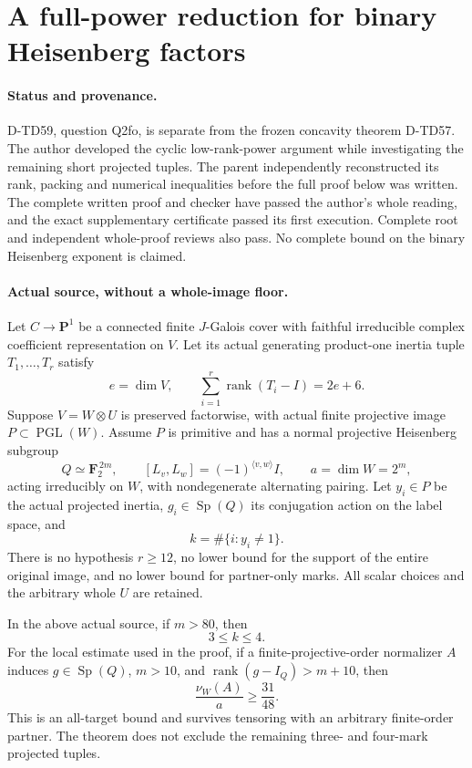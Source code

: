 \section{A full-power reduction for binary Heisenberg factors}
\label{sec:binary-heisenberg-power-profile}

\paragraph{Status and provenance.}
D-TD59, question Q2fo, is separate from the frozen concavity
theorem D-TD57.  The author developed the cyclic low-rank-power argument
while investigating the remaining short projected tuples.  The parent
independently reconstructed its rank, packing and numerical inequalities
before the full proof below was written.
The complete written proof and checker have passed the author's whole
reading, and the exact supplementary certificate passed its first execution.
Complete root and independent whole-proof reviews also pass.
No complete bound on the binary Heisenberg exponent is claimed.

\paragraph{Actual source, without a whole-image floor.}
Let \(C\to\mathbf P^1\) be a connected finite \(J\)-Galois cover with
faithful irreducible complex coefficient representation on \(V\).
Let its actual generating product-one inertia tuple \(T_1,\ldots,T_r\)
satisfy
\[
                e=\dim V,\qquad
                \sum_{i=1}^r\operatorname{rank}(T_i-I)=2e+6.
 \tag{BHP.1}
\]
Suppose \(V=W\otimes U\) is preserved factorwise, with actual finite
projective image \(P\subset\operatorname{PGL}(W)\).  Assume \(P\) is
primitive and has a normal projective Heisenberg subgroup
\[
 Q\simeq\mathbf F_2^{\,2m},\qquad
 [L_v,L_w]=(-1)^{\langle v,w\rangle}I,\qquad
             a=\dim W=2^m,
 \tag{BHP.2}
\]
acting irreducibly on \(W\), with nondegenerate alternating pairing.
Let \(y_i\in P\) be the actual projected inertia, \(g_i\in\operatorname{Sp}(Q)\)
its conjugation action on the label space, and
\[
                  k=\#\{i:y_i\ne1\}.
 \tag{BHP.3}
\]
There is no hypothesis \(r\ge12\), no lower bound for the support of
the entire original image, and no lower bound for partner-only marks.
All scalar choices and the arbitrary whole \(U\) are retained.

\begin{theorem}[D-TD59]
In the above actual source, if \(m>80\), then
\[
                              3\le k\le4.
 \tag{BHP.4}
\]
For the local estimate used in the proof, if a finite-projective-order
normalizer \(A\) induces \(g\in\operatorname{Sp}(Q)\), \(m>10\), and
\(\operatorname{rank}(g-I_Q)>m+10\), then
\[
                         \frac{\nu_W(A)}a\ge\frac{31}{48}.
 \tag{BHP.5}
\]
This is an all-target bound and survives tensoring with an arbitrary
finite-order partner.  The theorem does not exclude the remaining
three- and four-mark projected tuples.
\end{theorem}

